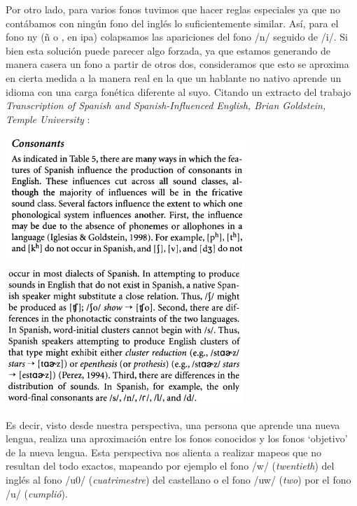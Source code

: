 
Por otro lado, para varios fonos tuvimos que hacer reglas especiales ya que no contábamos con ningún fono del inglés lo suficientemente similar. Así,  para el fono ny (ñ o \textltailn, en ipa) colapsamos las apariciones del fono /n/ seguido de /i/. Si bien esta solución puede parecer algo forzada, ya que estamos generando de manera casera un fono a partir de otros dos, consideramos que esto se aproxima en cierta medida a la manera real en la que un hablante no nativo aprende un idioma con una carga fonética diferente al suyo. Citando un extracto del trabajo \textit{Transcription of Spanish and Spanish-Influenced English, Brian Goldstein, Temple University} \cite{spanishInfluencedEnglish}:

\begin{center}
\includegraphics[scale=0.6]{imagenes_investigacion/consonantes1.png}
\includegraphics[scale=0.6]{imagenes_investigacion/consonantes2.png}
\end{center}

Es decir, visto desde nuestra perspectiva, una persona que aprende una nueva lengua, realiza una aproximación entre los fonos conocidos y los fonos `objetivo' de la nueva lengua. Esta perspectiva nos alienta a realizar mapeos que no resultan del todo exactos, mapeando por ejemplo el fono /w/ (\textit{twentieth}) del inglés al fono /u0/ (\textit{cuatrimestre}) del castellano o el fono /uw/ (\textit{two}) por el fono /u/ (\textit{cumplió}).

